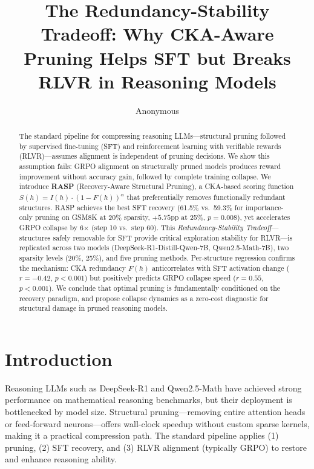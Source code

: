 \documentclass[11pt]{article}
\title{The Redundancy-Stability Tradeoff: Why CKA-Aware Pruning Helps SFT but Breaks RLVR in Reasoning Models}
\author{Anonymous}
\date{}
\begin{document}
\maketitle

\begin{abstract}
The standard pipeline for compressing reasoning LLMs---structural pruning followed by supervised fine-tuning (SFT) and reinforcement learning with verifiable rewards (RLVR)---assumes alignment is independent of pruning decisions.
We show this assumption fails: GRPO alignment on structurally pruned models produces reward improvement without accuracy gain, followed by complete training collapse.
We introduce \textbf{RASP} (Recovery-Aware Structural Pruning), a CKA-based scoring function $S(h)=I(h)\cdot(1{-}F(h))^\alpha$ that preferentially removes functionally redundant structures.
RASP achieves the best SFT recovery (61.5\% vs.\ 59.3\% for importance-only pruning on GSM8K at 20\% sparsity, $+5.75$pp at 25\%, $p{=}0.008$), yet accelerates GRPO collapse by 6$\times$ (step 10 vs.\ step 60).
This \emph{Redundancy-Stability Tradeoff}---structures safely removable for SFT provide critical exploration stability for RLVR---is replicated across two models (DeepSeek-R1-Distill-Qwen-7B, Qwen2.5-Math-7B), two sparsity levels (20\%, 25\%), and five pruning methods.
Per-structure regression confirms the mechanism: CKA redundancy $F(h)$ anticorrelates with SFT activation change ($r{=}{-}0.42$, $p{<}0.001$) but positively predicts GRPO collapse speed ($r{=}0.55$, $p{<}0.001$).
We conclude that optimal pruning is fundamentally conditioned on the recovery paradigm, and propose collapse dynamics as a zero-cost diagnostic for structural damage in pruned reasoning models.
\end{abstract}

\section{Introduction}

Reasoning LLMs such as DeepSeek-R1 and Qwen2.5-Math have achieved strong performance on mathematical reasoning benchmarks, but their deployment is bottlenecked by model size.
Structural pruning---removing entire attention heads or feed-forward neurons---offers wall-clock speedup without custom sparse kernels, making it a practical compression path.
The standard pipeline applies (1) pruning, (2) SFT recovery, and (3) RLVR alignment (typically GRPO) to restore and enhance reasoning ability.
\end{document}
